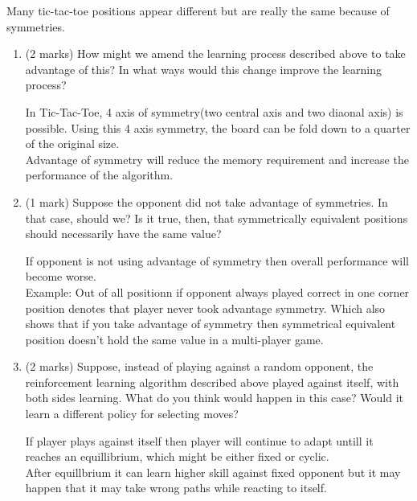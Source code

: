 \documentclass[addpoints,12pt,solution]{exam}
\begin{document}
\begin{questions}
\begin{enumerate}[label=(\alph*)]
\begin{solution}
\end{solution}
\end{enumerate}
 




\question[5]Many tic-tac-toe positions appear different but are really the same because of symmetries. 
\begin{enumerate}[label=(\alph*)]
    \item (2 marks) How might we amend the learning process described above to take advantage of this? In what ways would this change improve the learning process? 
    
\begin{solution}
In Tic-Tac-Toe, 4 axis of symmetry(two central axis and two diaonal axis) is possible. Using this 4 axis symmetry, the board can be fold down to a quarter of the original size.\\
Advantage of symmetry will reduce the memory requirement and increase the performance of the algorithm.
\end{solution}

    \item (1 mark) Suppose the opponent did not take advantage of symmetries. In that case, should we? Is it true, then, that symmetrically equivalent positions should necessarily have the same value? 
    
\begin{solution}
If opponent is not using advantage of symmetry then overall performance will become worse.  \\

Example:  Out of all positionn if opponent always played correct in one corner position denotes that player never took advantage symmetry. Which also shows that if you take advantage of symmetry then symmetrical equivalent position doesn't hold the same value in a multi-player game.

\end{solution}

    \item (2 marks) Suppose, instead of playing against a random opponent, the reinforcement learning algorithm described above played against itself, with both sides learning. What do you think  would happen in this case? Would it learn a different policy for selecting moves? 
    
\begin{solution}
If player plays against itself then player will continue to adapt untill it reaches an equillibrium, which might be either fixed or cyclic. \\
After equillbrium it can learn higher skill against fixed opponent but it may happen that it may take wrong paths while reacting to itself.\\



\end{solution}
\end{enumerate}
\end{questions}
\end{document}

